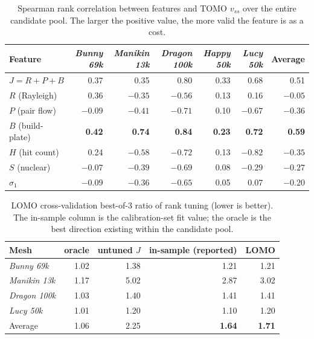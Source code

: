 \documentclass[11pt,a4paper]{article}
\begin{document}
\begin{table}[H]
\centering
\small
\caption{Spearman rank correlation between features and TOMO $v_{ss}$ over the entire candidate pool.
The larger the positive value, the more valid the feature is as a cost.}
\label{stab:feature-corr}
\begin{tabular}{lrrrrrr}
\toprule
Feature & \emph{Bunny 69k} & \emph{Manikin 13k} & \emph{Dragon 100k} & \emph{Happy 50k} & \emph{Lucy 50k} & Average\\
\midrule
$J=R{+}P{+}B$         & 0.37 & 0.35 & 0.80 & 0.33 & 0.68 & 0.51\\
$R$ (Rayleigh)        & 0.36 & $-0.35$ & $-0.56$ & 0.13 & 0.16 & $-0.05$\\
$P$ (pair flow)       & $-0.09$ & $-0.41$ & $-0.71$ & 0.10 & $-0.67$ & $-0.36$\\
$B$ (build-plate)     & \textbf{0.42} & \textbf{0.74} & \textbf{0.84} & \textbf{0.23} & \textbf{0.72} & \textbf{0.59}\\
$H$ (hit count)       & 0.24 & $-0.58$ & $-0.72$ & 0.13 & $-0.82$ & $-0.35$\\
$S$ (nuclear)         & $-0.07$ & $-0.39$ & $-0.69$ & 0.08 & $-0.29$ & $-0.27$\\
$\sigma_1$            & $-0.09$ & $-0.36$ & $-0.65$ & 0.05 & 0.07 & $-0.20$\\
\bottomrule
\end{tabular}
\end{table}

\begin{table}[H]
\centering
\caption{LOMO cross-validation best-of-3 ratio of rank tuning (lower is better).
The in-sample column is the calibration-set fit value; the oracle is the best direction existing within the candidate pool.}
\label{stab:lomo-cv}
\begin{tabular}{lrrrr}
\toprule
Mesh & oracle & untuned $J$ & in-sample (reported) & LOMO\\
\midrule
\emph{Bunny 69k}    & 1.02 & 1.38 & 1.21 & 1.21\\
\emph{Manikin 13k}  & 1.17 & 5.02 & 2.87 & 3.02\\
\emph{Dragon 100k}   & 1.03 & 1.40 & 1.41 & 1.41\\
\emph{Lucy 50k}     & 1.01 & 1.20 & 1.10 & 1.20\\
\midrule
Average     & 1.06 & 2.25 & \textbf{1.64} & \textbf{1.71}\\
\bottomrule
\end{tabular}
\end{table}
\end{document}
